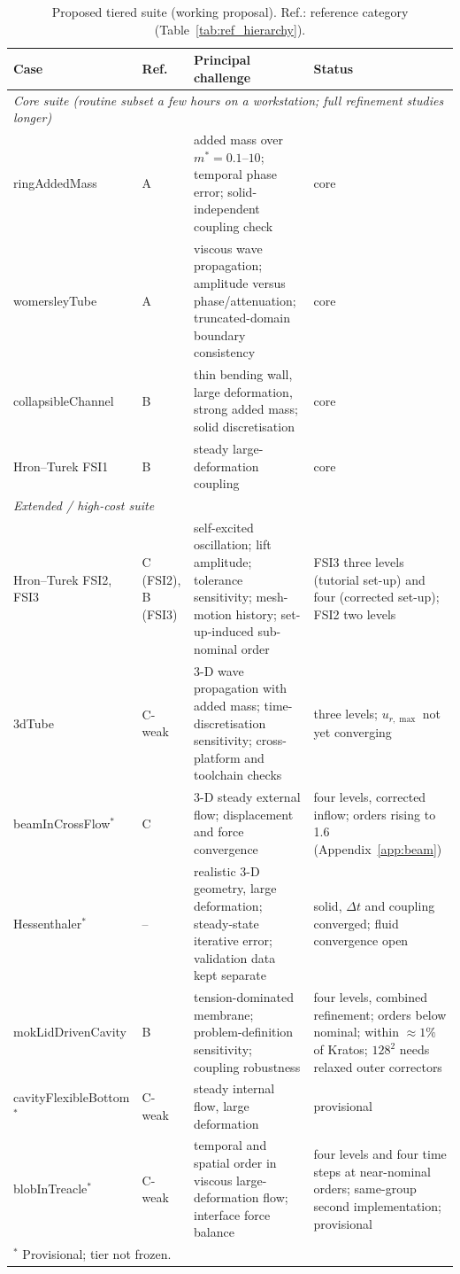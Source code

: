 \begin{table}[htbp]
	\centering
	\footnotesize
	\setlength{\tabcolsep}{3pt}
	\caption{Proposed tiered suite (working proposal). Ref.: reference category (Table~\ref{tab:ref_hierarchy}).}
	\label{tab:suite_tiers}
	\begin{tabular}{p{2.8cm}p{1.1cm}p{6.3cm}p{3.4cm}}
		\toprule
		Case & Ref. & Principal challenge & Status \\
		\midrule
		\multicolumn{4}{l}{\emph{Core suite (routine subset a few hours on a workstation; full refinement studies longer)}} \\
		ringAddedMass & A & added mass over $m^* = 0.1$--$10$; temporal phase error; solid-independent coupling check & core \\
		womersleyTube & A & viscous wave propagation; amplitude versus phase/attenuation; truncated-domain boundary consistency & core \\
		collapsibleChannel & B & thin bending wall, large deformation, strong added mass; solid discretisation & core \\
		Hron--Turek FSI1 & B & steady large-deformation coupling & core \\
		\midrule
		\multicolumn{4}{l}{\emph{Extended / high-cost suite}} \\
		Hron--Turek FSI2, FSI3 & C (FSI2), B (FSI3) & self-excited oscillation; lift amplitude; tolerance sensitivity; mesh-motion history; set-up-induced sub-nominal order & FSI3 three levels (tutorial set-up) and four (corrected set-up); FSI2 two levels \\
		3dTube & C-weak & 3-D wave propagation with added mass; time-discretisation sensitivity; cross-platform and toolchain checks & three levels; $u_{r,\max}$ not yet converging \\
		beamInCrossFlow$^\ast$ & C & 3-D steady external flow; displacement and force convergence & four levels, corrected inflow; orders rising to 1.6 (Appendix~\ref{app:beam}) \\
		Hessenthaler$^\ast$ & -- & realistic 3-D geometry, large deformation; steady-state iterative error; validation data kept separate & solid, $\Delta t$ and coupling converged; fluid convergence open \\
		mokLidDrivenCavity & B & tension-dominated membrane; problem-definition sensitivity; coupling robustness & four levels, combined refinement; orders below nominal; within $\approx1\%$ of Kratos; $128^2$ needs relaxed outer correctors \\
		cavityFlexibleBottom$^\ast$ & C-weak & steady internal flow, large deformation & provisional \\
		blobInTreacle$^\ast$ & C-weak & temporal and spatial order in viscous large-deformation flow; interface force balance & four levels and four time steps at near-nominal orders; same-group second implementation; provisional \\
		\bottomrule
		\multicolumn{4}{l}{$^\ast$ Provisional; tier not frozen.}
	\end{tabular}
\end{table}

